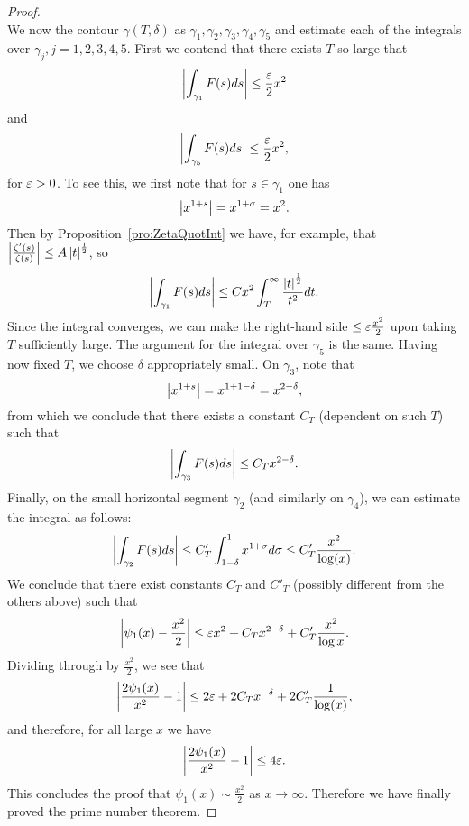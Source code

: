 \begin{proof}
\begin{equation*}
\end{equation*}
	We now the contour $\gamma(T, \delta)$ as $\gamma_1, \gamma_2, \gamma_3, \gamma_4, \gamma_5$ and estimate each of the integrals over $\gamma_j, j=1,2,3,4,5$. First we contend that there exists $T$ so large that
\begin{equation*}
	\left|\int _{\gamma_1} F(s) ds\right|\leq \frac{\varepsilon}{2} x^2
\end{equation*}
	and
\begin{equation*}
	\left|\int _{\gamma_5} F(s) ds\right|\leq \frac{\varepsilon}{2} x^2,
\end{equation*}
	for $\varepsilon > 0$. To see this, we first note that for $s \in \gamma_1$ one has
\begin{equation*}
	\left|x^{1 + s}\right| = x^{1 + \sigma} = x^2.
\end{equation*}
	Then by Proposition~\ref{pro:ZetaQuotInt} we have, for example, that $\left|\frac{\zeta'(s)}{\zeta(s)}\right| \leq A \left|t\right|^{\frac{1}{2}}$, so
\begin{equation*}
	\left|\int _{\gamma_1} F(s) ds\right| \leq C x^2 \int _T ^\infty \frac{\left|t\right|^\frac{1}{2}}{t^2} dt.
\end{equation*}
	Since the integral converges, we can make the right-hand side $\leq \varepsilon \frac{x^2}{2}$ upon taking $T$ sufficiently large. The argument for the integral over $\gamma_5$ is the same. Having now fixed $T$, we choose $\delta$ appropriately small. On $\gamma_3$, note that
\begin{equation*}
	\left|x^{1 + s}\right| = x^{1 + 1 - \delta} = x^{2 - \delta},
\end{equation*}
	from which we conclude that there exists a constant $C_T$ (dependent on such $T$) such that
\begin{equation*}
	\left|\int _{\gamma_3} F(s) ds\right| \leq C_T x^{2 - \delta}.
\end{equation*}
	Finally, on the small horizontal segment $\gamma_2$ (and similarly on $\gamma_4$), we can estimate the integral as follows:
\begin{equation*}
	\left|\int _{\gamma_2} F(s) ds\right| \leq C'_T \int _{1 - \delta} ^1 x^{1 + \sigma} d\sigma \leq C'_T \frac{x^2}{\log(x)}.
\end{equation*}
	We conclude that there exist constants $C_T$ and $C'_T$ (possibly different from the others above) such that
\begin{equation*}
	\left|\psi_1(x) - \frac{x^2}{2}\right| \leq \varepsilon x^2 + C_T x^{2 - \delta} + C'_T \frac{x^2}{\log{x}}.
\end{equation*}
	Dividing through by $\frac{x^2}{2}$, we see that
\begin{equation*}
	\left|\frac{2 \psi_1(x)}{x^2} - 1\right| \leq 2\varepsilon + 2 C_T x^{-\delta} + 2 C'_T \frac{1}{\log(x)},
\end{equation*}
	and therefore, for all large $x$ we have
\begin{equation*}
	\left|\frac{2 \psi_1(x)}{x^2} - 1\right| \leq 4 \varepsilon.
\end{equation*}
	This concludes the proof that $\psi_1(x) \sim \frac{x^2}{2}$ as $x \to \infty$. Therefore we have finally proved the prime number theorem.
\end{proof}